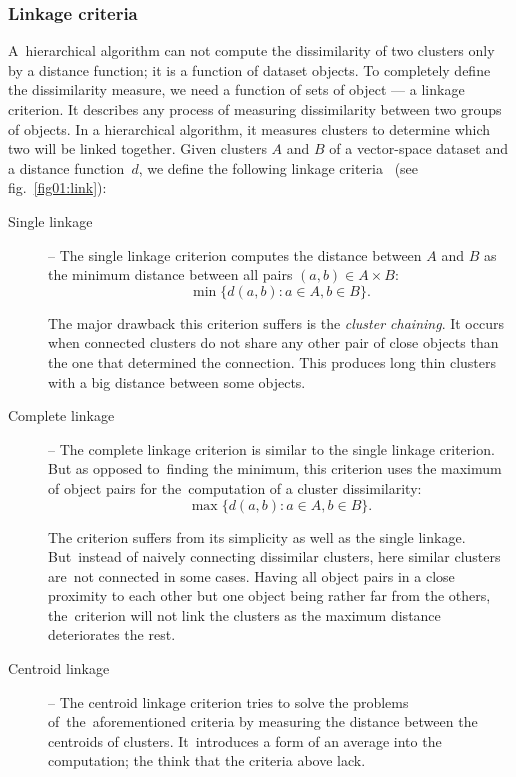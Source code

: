 \subsubsection{Linkage criteria}

A~hierarchical algorithm can not compute the dissimilarity of two clusters only by a distance function; it is a function of dataset objects. To completely define the dissimilarity measure, we need a function of sets of object --- a linkage criterion. It describes any process of measuring dissimilarity between two groups of objects. In a hierarchical algorithm, it measures clusters to determine which two will be linked together. Given clusters $A$ and $B$ of a vector-space dataset and a distance function~$d$, we define the following linkage criteria~\cite{yim2015hierarchical} (see fig.~\ref{fig01:link}):

\begin{description}
	\item[Single linkage] -- The single linkage criterion computes the distance between $A$ and $B$ as the minimum distance between all pairs $(a,b) \in A\times B$:
	$$\min\{d(a,b) : a \in A, b \in B\}.$$
	
	The major drawback this criterion suffers is the \emph{cluster chaining}. It occurs when connected clusters do not share any other pair of close objects than the one that determined the connection. This produces long thin clusters with a big distance between some objects.
	
	\item[Complete linkage] -- The complete linkage criterion is similar to the single linkage criterion. But as opposed to~finding the minimum, this criterion uses the maximum of object pairs for the~computation of a cluster dissimilarity:
	$$\max\{d(a,b) : a \in A, b \in B\}.$$
	
	The criterion suffers from its simplicity as well as the single linkage. But~instead of naively connecting dissimilar clusters, here similar clusters are~not connected in some cases. Having all object pairs in a close proximity to each other but one object being rather far from the others, the~criterion will not link the clusters as the maximum distance deteriorates the rest.
	
	\item[Centroid linkage] -- The centroid linkage criterion tries to solve the problems of~the~aforementioned criteria by measuring the distance between the centroids of clusters. It~introduces a form of an average into the computation; the think that the criteria above lack.
\end{description}

